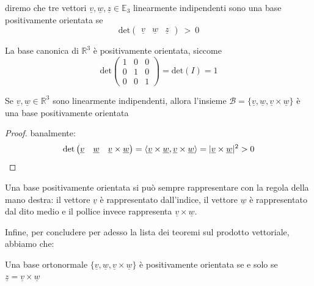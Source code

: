 %
\vspace{0.5cm}
\begin{definition}[\textcolor{blue}{base positivamente orientata}]
diremo che tre vettori $\underline{v}, \underline{w}, \underline{z} \in \mathbb{E}_3$ linearmente indipendenti sono una base positivamente orientata se
%
\[\text{det}
\begin{pmatrix}
	\underline{v} & \underline{w} & \underline{z}
\end{pmatrix}\ >\ 0\]
\end{definition}
%
\begin{remark}
La base canonica di $\mathbb{R}^3$ è positivamente orientata, siccome
%
\[\text{det}\begin{pmatrix}
	1 & 0 & 0 \\
	0 & 1 & 0 \\
	0 & 0 & 1
\end{pmatrix} = \text{det}(I) = 1\]
\end{remark}
%
\begin{prop}
	Se $\underline{v}, \underline{w} \in \mathbb{R}^3$ sono linearmente indipendenti, allora l'insieme $\mathcal{B} = \{\underline{v}, \underline{w}, \underline{v} \times \underline{w} \}$ è una base positivamente orientata
\label{prop:base_pos_orient}
\end{prop}
%
\vspace{0.5cm}
\begin{proof}
banalmente:
%
\[
\text{det}\begin{pmatrix}
	\underline{v} & \underline{w} & \underline{v} \times \underline{w} \end{pmatrix} = \langle \underline{v} \times \underline{w}, \underline{v} \times \underline{w} \rangle = |\underline{v} \times \underline{w}|^2 >  0
\]
\end{proof}
%
\begin{remark}
Una base positivamente orientata si può sempre rappresentare con la regola della mano destra: il vettore $\underline{v}$ è rappresentato dall'indice, il vettore $\underline{w}$ è rappresentato dal dito medio e il pollice invece rappresenta $\underline{v} \times \underline{w}$.
\end{remark}
%
\noindent Infine, per concludere per adesso la lista dei teoremi sul prodotto vettoriale, abbiamo che:
%
\vspace{0.5cm}
\begin{prop}
Una base ortonormale $\{ \underline{v} , \underline{w} , \underline{v} \times \underline{w} \}$ è positivamente orientata se e solo se $\underline{z} = \underline{v} \times \underline{w}$
\end{prop}
